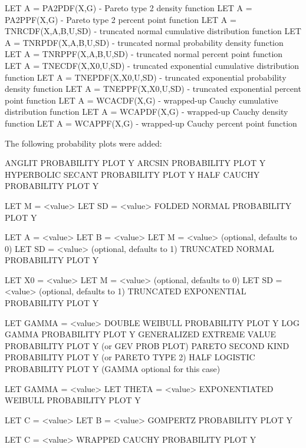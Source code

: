 {      LET A = PA2PDF(X,G) - Pareto type 2 density function
      LET A = PA2PPF(X,G) - Pareto type 2 percent point function
      LET A = TNRCDF(X,A,B,U,SD) - truncated normal cumulative
                                   distribution function
      LET A = TNRPDF(X,A,B,U,SD) - truncated normal probability density
                                   function
      LET A = TNRPPF(X,A,B,U,SD) - truncated normal percent point
                                   function
      LET A = TNECDF(X,X0,U,SD) - truncated exponential cumulative
                                  distribution function
      LET A = TNEPDF(X,X0,U,SD) - truncated exponential probability
                                  density function
      LET A = TNEPPF(X,X0,U,SD) - truncated exponential percent point
                                  function
      LET A = WCACDF(X,G) - wrapped-up Cauchy cumulative distribution
                            function
      LET A = WCAPDF(X,G) - wrapped-up Cauchy density function
      LET A = WCAPPF(X,G) - wrapped-up Cauchy percent point function

    The following probability plots were added:

      ANGLIT PROBABILITY PLOT Y
      ARCSIN PROBABILITY PLOT Y
      HYPERBOLIC SECANT PROBABILITY PLOT Y
      HALF CAUCHY PROBABILITY PLOT Y

      LET M = <value>
      LET SD = <value>
      FOLDED NORMAL PROBABILITY PLOT Y

      LET A = <value>
      LET B = <value>
      LET M = <value>  (optional, defaults to 0)
      LET SD = <value> (optional, defaults to 1)
      TRUNCATED NORMAL PROBABILITY PLOT Y

      LET X0 = <value>
      LET M = <value>  (optional, defaults to 0)
      LET SD = <value> (optional, defaults to 1)
      TRUNCATED EXPONENTIAL PROBABILITY PLOT Y

      LET GAMMA = <value>
      DOUBLE WEIBULL PROBABILITY PLOT Y
      LOG GAMMA PROBABILITY PLOT Y
      GENERALIZED EXTREME VALUE PROBABILITY PLOT Y  (or GEV PROB PLOT)
      PARETO SECOND KIND PROBABILITY PLOT Y   (or PARETO TYPE 2)
      HALF LOGISTIC PROBABILITY PLOT Y  (GAMMA optional for this case)
      
      LET GAMMA = <value>
      LET THETA = <value>
      EXPONENTIATED WEIBULL PROBABILITY PLOT Y

      LET C = <value>
      LET B = <value>
      GOMPERTZ PROBABILITY PLOT Y

      LET C = <value>
      WRAPPED CAUCHY PROBABILITY PLOT Y

}
